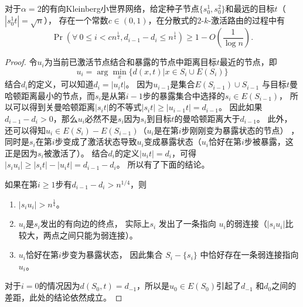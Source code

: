 \begin{lemma}
\label{lem:routing}
对于$\alpha = 2$的有向Kleinberg小世界网络，给定种子节点$\{s_0^1,s_0^2\}$和最远的目标$t$（$|s_0^1t| = \sqrt{n}$），
存在一个常数$c \in (0,1)$，在分散式的$2$-$k$-激活路由的过程中有
$$\Pr(\forall~0 \leq i < cn^{\frac{1}{4}}, d_{i-1}-d_{i}\leq n^{\frac{1}{4}})\geq 1-O(\frac{1}{\log n}).$$
\end{lemma}

\begin{proof}
令$u_{i}$为当前已激活节点结合和暴露的节点中距离目标$t$最近的节点，即
$$u_{i} = \arg\min_x \{ d(x,t) | x\in S_i \cup E(S_{i}) \}$$
结合$d_i$的定义，可以知道$d_i = |u_{i}t|$。
因为$u_{i-1}$是集合$E(S_{i-1}) \cup S_{i-1}$ 与目标$t$曼哈顿距离最小的节点，而$s_i$是从第$i-1$步的暴露集合中选择的$s_i \in E(S_{i-1})$，
所以可以得到关曼哈顿距离$|s_{i}t|$的不等式$|s_{i}t| \geq |u_{i-1}t| = d_{i-1}$。
因此如果$d_{i-1}-d_{i}> 0$，那么$u_{i}$必然不是$s_i$因为$s_i$到目标$t$的曼哈顿距离大于$d_{i-1}$。
此外，还可以得知$u_i \in E(S_i) - E(S_{i-1})$（$u_i$是在第$i$步刚刚变为暴露状态的节点）
，同时是$s_i$在第$i$步变成了激活状态导致$u_i$变成暴露状态（$u_i$恰好在第$i$步被暴露，这正是因为$s_i$被激活了）。
结合$d_i$的定义$|u_{i}t| = d_{i}$，可得$|s_{i}u_{i}| \geq |s_{i}t| - |u_{i}t| = d_{i-1}-d_{i}$。
所以有了下面的结论。

如果在第$i \geq 1$步有$d_{i-1}-d_{i}> n^{1/4}$，则
\vspace{0.2cm}
\begin{enumerate} 
\item $|s_{i}u_{i}| > n^{\frac{1}{4}}$。
\item $u_i$是$s_i$发出的有向边的终点， 实际上$s_i$ 发出了一条指向 $u_i$的弱连接（$|s_{i}u_{i}|$比较大，两点之间只能为弱连接）。
\item $u_i$恰好在第$i$步变为暴露状态， 因此集合 $S_{i} - \{s_i\}$ 中恰好存在一条弱连接指向 $u_i$。
\end{enumerate}
对于$i=0$的情况因为$d(S_0,t) = d_{-1}$，所以是$u_0 \in E(S_0)$引起了$d_{-1}$ 和$d_0$之间的差距，此处的结论依然成立。


\end{proof}
